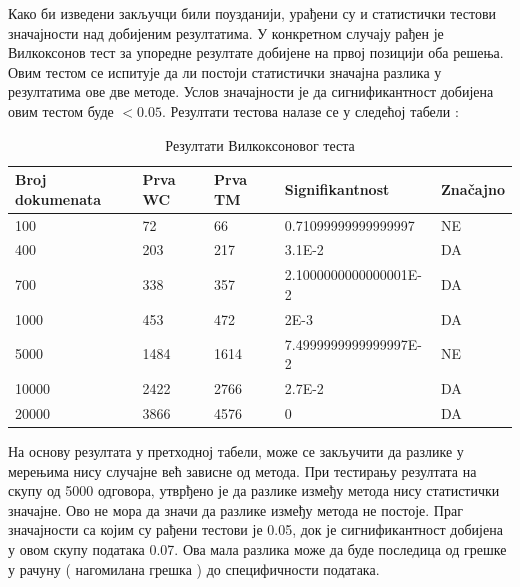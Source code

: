 Како би изведени закључци били поузданији, урађени су и статистички тестови значајности над добијеним резултатима. У конкретном случају рађен је Вилкоксонов тест за упоредне резултате добијене на првој позицији оба решења. Овим тестом се испитује  да ли постоји статистички значајна разлика у резултатима ове две методе. Услов значајности је да сигнификантност добијена овим тестом буде $<0.05$. Резултати тестова налазе се у следећој табели :
\begin{table}[H]
\centering
\caption{Резултати Вилкоксоновог теста}

\begin{tabular}{ | l | l | l | l | l | }
\hline
	
	Broj dokumenata & Prva WC & Prva TM & Signifikantnost & Značajno \\ \hline
	100 & 72 & 66 & 0.71099999999999997 & NE \\ \hline
	400 & 203 & 217 & 3.1E-2 & DA \\ \hline
	700 & 338 & 357 & 2.1000000000000001E-2 & DA \\ \hline
	1000 & 453 & 472 & 2E-3 & DA \\ \hline
	5000 & 1484 & 1614 & 7.4999999999999997E-2 & NE \\ \hline
	10000 & 2422 & 2766 & 2.7E-2 & DA \\ \hline
	20000 & 3866 & 4576 & 0 & DA \\ \hline
	
\end{tabular}

\end{table}

На основу резултата у претходној табели, може се закључити да разлике у мерењима нису случајне већ зависне од метода. При тестирању резултата на скупу од 5000 одговора, утврђено је да разлике између метода нису статистички значајне. Ово не мора да значи да разлике између метода не постоје. Праг значајности са којим су рађени тестови је 0.05, док је сигнификантност добијена у овом скупу података 0.07. Ова мала разлика може да буде последица од грешке у рачуну ( нагомилана грешка ) до специфичности података. 